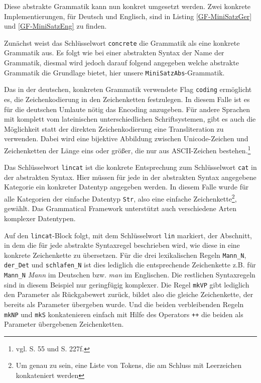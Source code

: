 \documentclass[fontsize=12pt,abstract=on,titlepage,bibliography=totoc,ngerman,listof=totoc]{scrreprt}
\begin{document}

Diese abstrakte Grammatik kann nun konkret umgesetzt werden. Zwei konkrete Implementierungen, für Deutsch und Englisch, sind in Listing \ref{GF-MiniSatzGer} und \ref{GF-MiniSatzEng} zu finden. \par


Zunächst weist das Schlüsselwort \texttt{concrete} die Grammatik als eine konkrete Grammatik aus. Es folgt wie bei einer abstrakten Syntax der Name der Grammatik, diesmal wird jedoch darauf folgend angegeben welche abstrakte Grammatik die Grundlage bietet, hier unsere \texttt{MiniSatzAbs}-Grammatik. \par
Das in der deutschen, konkreten Grammatik verwendete Flag \texttt{coding} ermöglicht es, die Zeichenkodierung in den Zeichenketten festzulegen. In diesem Falle ist es für die deutschen Umlaute nötig das Encoding anzugeben. Für andere Sprachen mit komplett vom lateinischen unterschiedlichen Schriftsystemen, gibt es auch die Möglichkeit statt der direkten Zeichenkodierung eine Transliteration zu verwenden. Dabei wird eine bijektive Abbildung zwischen Unicode-Zeichen und Zeichenketten der Länge eins oder größer, die nur aus ASCII-Zeichen bestehen.\footnote{vgl. \cite{RANTA2011} S. 55 und S. 227f.} \par
Das Schlüsselwort \texttt{lincat} ist die konkrete Entsprechung zum Schlüsselwort \texttt{cat} in der abstrakten Syntax. Hier müssen für jede in der abstrakten Syntax angegebene Kategorie ein konkreter Datentyp angegeben werden. In diesem Falle wurde für alle Kategorien der einfache Datentyp \texttt{Str}, also eine einfache Zeichenkette\footnote{Um genau zu sein, eine Liste von Tokens, die am Schluss mit Leerzeichen konkateniert werden}, gewählt. Das Grammatical Framework unterstützt auch verschiedene Arten komplexer Datentypen. \par
Auf den \texttt{lincat}-Block folgt, mit dem Schlüsselwort \texttt{lin} markiert, der Abschnitt, in dem die für jede abstrakte Syntaxregel beschrieben wird, wie diese in eine konkrete Zeichenkette zu übersetzen. Für die drei lexikalischen Regeln \texttt{Mann\_N}, \texttt{der\_Det} und \texttt{schlafen\_N} ist dies lediglich die entsprechende Zeichenkette z.B. für \texttt{Mann\_N} \textit{Mann} im Deutschen bzw. \textit{man} im Englischen. Die restlichen Syntaxregeln sind in diesem Beispiel nur geringfügig komplexer. Die Regel \texttt{mkVP} gibt lediglich den Parameter als Rückgabewert zurück, bildet also die gleiche Zeichenkette, der bereits als Parameter übergeben wurde. Und die beiden verbleibenden Regeln \texttt{mkNP} und \texttt{mkS} konkatenieren einfach mit Hilfe des Operators \texttt{++} die beiden als Parameter übergebenen Zeichenketten. \par
\end{document}
